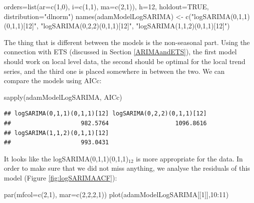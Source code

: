 \documentclass[
]{book}
\newenvironment{Shaded}{\begin{snugshade}}{\end{snugshade}}
\newcommand{\AttributeTok}[1]{\textcolor[rgb]{0.77,0.63,0.00}{#1}}
\newcommand{\ConstantTok}[1]{\textcolor[rgb]{0.00,0.00,0.00}{#1}}
\newcommand{\DecValTok}[1]{\textcolor[rgb]{0.00,0.00,0.81}{#1}}
\newcommand{\FunctionTok}[1]{\textcolor[rgb]{0.00,0.00,0.00}{#1}}
\newcommand{\NormalTok}[1]{#1}
\newcommand{\OtherTok}[1]{\textcolor[rgb]{0.56,0.35,0.01}{#1}}
\newcommand{\SpecialCharTok}[1]{\textcolor[rgb]{0.00,0.00,0.00}{#1}}
\newcommand{\StringTok}[1]{\textcolor[rgb]{0.31,0.60,0.02}{#1}}
\theoremstyle{definition}
\theoremstyle{definition}
\theoremstyle{definition}
\theoremstyle{definition}
\theoremstyle{remark}
\begin{document}
\begin{Shaded}
\begin{Highlighting}[]
       \AttributeTok{orders=}\FunctionTok{list}\NormalTok{(}\AttributeTok{ar=}\FunctionTok{c}\NormalTok{(}\DecValTok{1}\NormalTok{,}\DecValTok{0}\NormalTok{), }\AttributeTok{i=}\FunctionTok{c}\NormalTok{(}\DecValTok{1}\NormalTok{,}\DecValTok{1}\NormalTok{), }\AttributeTok{ma=}\FunctionTok{c}\NormalTok{(}\DecValTok{2}\NormalTok{,}\DecValTok{1}\NormalTok{)),}
       \AttributeTok{h=}\DecValTok{12}\NormalTok{, }\AttributeTok{holdout=}\ConstantTok{TRUE}\NormalTok{, }\AttributeTok{distribution=}\StringTok{"dlnorm"}\NormalTok{)}
\FunctionTok{names}\NormalTok{(adamModelLogSARIMA) }\OtherTok{\textless{}{-}} \FunctionTok{c}\NormalTok{(}\StringTok{"logSARIMA(0,1,1)(0,1,1)[12]"}\NormalTok{,}
                               \StringTok{"logSARIMA(0,2,2)(0,1,1)[12]"}\NormalTok{,}
                               \StringTok{"logSARIMA(1,1,2)(0,1,1)[12]"}\NormalTok{)}
\end{Highlighting}
\end{Shaded}

The thing that is different between the models is the non-seasonal part. Using the connection with ETS (discussed in Section \ref{ARIMAandETS}), the first model should work on local level data, the second should be optimal for the local trend series, and the third one is placed somewhere in between the two. We can compare the models using AICc:

\begin{Shaded}
\begin{Highlighting}[]
\FunctionTok{sapply}\NormalTok{(adamModelLogSARIMA, AICc)}
\end{Highlighting}
\end{Shaded}

\begin{verbatim}
## logSARIMA(0,1,1)(0,1,1)[12] logSARIMA(0,2,2)(0,1,1)[12] 
##                    982.5764                   1096.8616 
## logSARIMA(1,1,2)(0,1,1)[12] 
##                    993.0431
\end{verbatim}

It looks like the logSARIMA(0,1,1)(0,1,1)\(_{12}\) is more appropriate for the data. In order to make sure that we did not miss anything, we analyse the residuals of this model (Figure \ref{fig:logSARIMAACF}):

\begin{Shaded}
\begin{Highlighting}[]
\FunctionTok{par}\NormalTok{(}\AttributeTok{mfcol=}\FunctionTok{c}\NormalTok{(}\DecValTok{2}\NormalTok{,}\DecValTok{1}\NormalTok{), }\AttributeTok{mar=}\FunctionTok{c}\NormalTok{(}\DecValTok{2}\NormalTok{,}\DecValTok{2}\NormalTok{,}\DecValTok{2}\NormalTok{,}\DecValTok{1}\NormalTok{))}
\FunctionTok{plot}\NormalTok{(adamModelLogSARIMA[[}\DecValTok{1}\NormalTok{]],}\DecValTok{10}\SpecialCharTok{:}\DecValTok{11}\NormalTok{)}
\end{Highlighting}
\end{Shaded}
\end{document}
